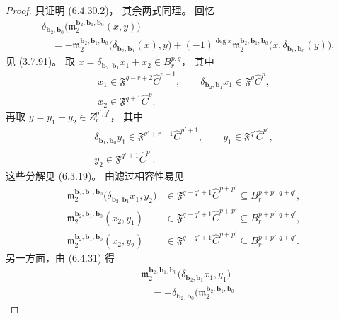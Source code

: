 \begin{proof}
只证明 (6.4.30.2)，
其余两式同理。
回忆
\begin{equation}
\begin{aligned}
&\delta_{\mathbf b_2,\mathbf b_0}
\bigl(\mathfrak m_2^{\mathbf b_2,\mathbf b_1,\mathbf b_0}(x,y)\bigr)\\
&\quad=-\mathfrak m_2^{\mathbf b_2,\mathbf b_1,\mathbf b_0}
\bigl(\delta_{\mathbf b_2,\mathbf b_1}(x),y\bigr)
+(-1)^{\deg x}
\mathfrak m_2^{\mathbf b_2,\mathbf b_1,\mathbf b_0}
\bigl(x,\delta_{\mathbf b_1,\mathbf b_0}(y)\bigr).
\end{aligned}
\tag{6.4.31}\label{eq:6-4-31}
\end{equation}
见 (3.7.91)。
取
$x=\delta_{\mathbf b_2,\mathbf b_1}x_1+x_2
\in B_r^{p,q}$，
其中
\[
\begin{gathered}
x_1\in\mathfrak F^{q-r+2}\widehat C^{p-1},
\qquad
\delta_{\mathbf b_2,\mathbf b_1}x_1
\in\mathfrak F^q\widehat C^p,\\
x_2\in\mathfrak F^{q+1}\widehat C^p.
\end{gathered}
\]
再取 $y=y_1+y_2\in Z_r^{p',q'}$，
其中
\[
\begin{gathered}
\delta_{\mathbf b_1,\mathbf b_0}y_1
\in\mathfrak F^{q'+r-1}\widehat C^{p'+1},
\qquad
y_1\in\mathfrak F^{q'}\widehat C^{p'},\\
y_2\in\mathfrak F^{q'+1}\widehat C^{p'}.
\end{gathered}
\]
这些分解见 (6.3.19)。
由滤过相容性易见
\[
\begin{aligned}
\mathfrak m_2^{\mathbf b_2,\mathbf b_1,\mathbf b_0}
\bigl(\delta_{\mathbf b_2,\mathbf b_1}x_1,y_2\bigr)
&\in\mathfrak F^{q+q'+1}\widehat C^{p+p'}
\subseteq B_r^{p+p',q+q'},\\
\mathfrak m_2^{\mathbf b_2,\mathbf b_1,\mathbf b_0}(x_2,y_1)
&\in\mathfrak F^{q+q'+1}\widehat C^{p+p'}
\subseteq B_r^{p+p',q+q'},\\
\mathfrak m_2^{\mathbf b_2,\mathbf b_1,\mathbf b_0}(x_2,y_2)
&\in\mathfrak F^{q+q'+1}\widehat C^{p+p'}
\subseteq B_r^{p+p',q+q'}.
\end{aligned}
\]
另一方面，由 (6.4.31) 得
\[
\begin{aligned}
&\mathfrak m_2^{\mathbf b_2,\mathbf b_1,\mathbf b_0}
\bigl(\delta_{\mathbf b_2,\mathbf b_1}x_1,y_1\bigr)\\
&\quad=-\delta_{\mathbf b_2,\mathbf b_0}
\bigl(\mathfrak m_2^{\mathbf b_2,\mathbf b_1,\mathbf b_0}

\end{aligned}\]
\end{proof}
